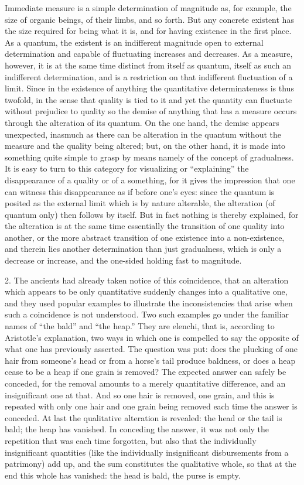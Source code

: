 Immediate measure is a simple determination of magnitude as,
for example, the size of organic beings, of their limbs, and so forth.
But any concrete existent has the size required for being what it is,
and for having existence in the first place.
As a quantum, the existent is an indifferent magnitude
open to external determination
and capable of fluctuating increases and decreases.
As a measure, however, it is at the same time
distinct from itself as quantum,
itself as such an indifferent determination,
and is a restriction on that indifferent fluctuation of a limit.
Since in the existence of anything
the quantitative determinateness is thus twofold,
in the sense that quality is tied to it
and yet the quantity can fluctuate without prejudice to quality
so the demise of anything that has a measure occurs
through the alteration of its quantum.
On the one hand, the demise appears unexpected,
inasmuch as there can be alteration
in the quantum without the measure
and the quality being altered;
but, on the other hand, it is made into something quite simple
to grasp by means namely of the concept of gradualness.
It is easy to turn to this category for visualizing
or “explaining” the disappearance of a quality or of a something,
for it gives the impression that one can witness this disappearance
as if before one's eyes:
since the quantum is posited as the external limit
which is by nature alterable,
the alteration (of quantum only) then follows by itself.
But in fact nothing is thereby explained,
for the alteration is at the same time essentially
the transition of one quality into another,
or the more abstract transition of one existence into a non-existence,
and therein lies another determination than just gradualness,
which is only a decrease or increase,
and the one-sided holding fast to magnitude.

2. The ancients had already taken notice of this coincidence,
that an alteration which appears to be only quantitative
suddenly changes into a qualitative one,
and they used popular examples to illustrate
the inconsistencies that arise when such
a coincidence is not understood.
Two such examples go under the familiar names
of “the bald” and “the heap.”
They are elenchi, that is, according to Aristotle's explanation,
two ways in which one is compelled to say
the opposite of what one has previously asserted.
The question was put:
does the plucking of one hair from someone's head
or from a horse's tail produce baldness,
or does a heap cease to be a heap
if one grain is removed?
The expected answer can safely be conceded,
for the removal amounts to a merely quantitative difference,
and an insignificant one at that.
And so one hair is removed, one grain,
and this is repeated with only one hair and one grain
being removed each time the answer is conceded.
At last the qualitative alteration is revealed:
the head or the tail is bald; the heap has vanished.
In conceding the answer, it was not only
the repetition that was each time forgotten,
but also that the individually insignificant quantities
(like the individually insignificant disbursements from a patrimony)
add up, and the sum constitutes the qualitative whole,
so that at the end this whole has vanished:
the head is bald, the purse is empty.

